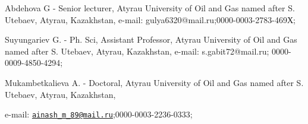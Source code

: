 \begin{authorinfo}
Abdehova G - Senior lecturer, Atyrau Uni󠀁versity of Oil and Gas
nam󠀁ed aft󠀁er S. Ute󠀁baev, Aty󠀁rau, Kaz󠀁akhstan, e-mail:
gulya6320@mail.ru;0000-0003-2783-469Х;

Suyungariev G. - Ph. Sci, Assistant Professor, Atyrau
Uni󠀁versity of Oil and Gas nam󠀁ed aft󠀁er S. Ute󠀁baev, Aty󠀁rau, Kaz󠀁akhstan,
e-mail: s.gabit72@mail.ru;
0000-0009-4850-4294;

Mukambetkalieva A. - Doctoral, Atyrau Uni󠀁versity of Oil and Gas nam󠀁ed
aft󠀁er S. Ute󠀁baev, Aty󠀁rau, Kaz󠀁akhstan,

e-mail: \href{mailto:ainash\_m_89@mail.ru}{\nolinkurl{ainash\_m\_89@mail.ru}};0000-0003-2236-0333;\
\end{authorinfo}
